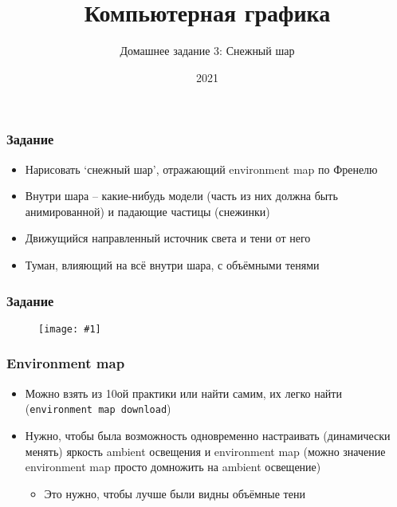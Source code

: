 \documentclass{beamer}
\title{Компьютерная графика}
\subtitle{Домашнее задание 3: Снежный шар}
\date{2021}
\newcommand{\slideimage}[1]{
  \begin{figure}
    \begin{adjustbox}{width=\textwidth, totalheight=\textheight-2\baselineskip-2\baselineskip,keepaspectratio}
      \texttt{[image: \#1]}
    \end{adjustbox}
  \end{figure}
}
\begin{document}
\frame{\titlepage}

\begin{frame}[fragile]
\frametitle{Задание}
\begin{itemize}
\item Нарисовать `снежный шар', отражающий environment map по Френелю
\item Внутри шара -- какие-нибудь модели (часть из них должна быть анимированной) и падающие частицы (снежинки)
\item Движущийся направленный источник света и тени от него
\item Туман, влияющий на всё внутри шара, с объёмными тенями
\end{itemize}
\end{frame}

\begin{frame}[fragile]
\frametitle{Задание}
\slideimage{example.png}
\end{frame}

\begin{frame}[fragile]
\frametitle{Environment map}
\begin{itemize}
\item Можно взять из 10ой практики или найти самим, их легко найти (\verb|environment map download|)
\item Нужно, чтобы была возможность одновременно настраивать (динамически менять) яркость ambient освещения и environment map (можно значение environment map просто домножить на ambient освещение)
\begin{itemize}
\item Это нужно, чтобы лучше были видны объёмные тени
\end{itemize}
\end{itemize}
\end{frame}
\end{document}
